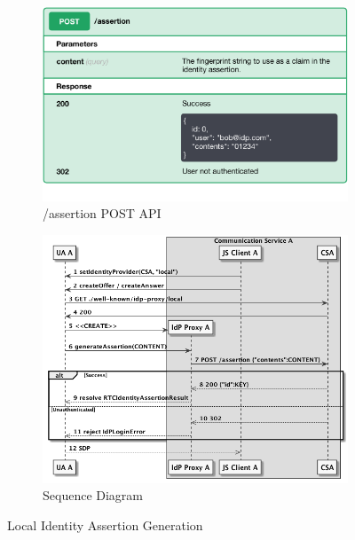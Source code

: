 \begin{figure}
\begin{subfigure}{\textwidth}
\begin{center}
    \includegraphics[scale=0.5]{images/localProxyAPIPOST}
\caption{/assertion POST API}
\label{idpproxyimplem:postapi}
\end{center}
\end{subfigure}
\begin{subfigure}{\textwidth}
\begin{center}
    \includegraphics[scale=0.55]{images/localAuthGen}
\caption{Sequence Diagram}
\label{localAuthGen:seq}
\end{center}
\end{subfigure}
\caption{Local Identity Assertion Generation}
\label{localAuthGen}
\end{figure}

